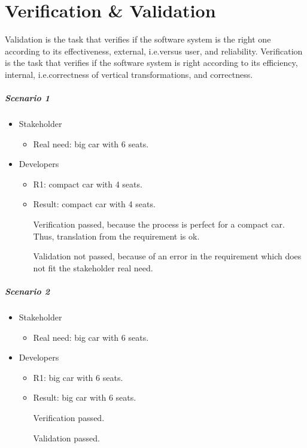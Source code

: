 \chapter{Verification \& Validation}
Validation is the task that verifies if the software system is the right one according to its effectiveness, external, i.e.\@  versus user, and reliability. Verification is the task that verifies if the software system is right according to its efficiency, internal, i.e.\@ correctness of vertical transformations, and correctness.

\paragraph{Scenario 1}
\begin{itemize}
\item Stakeholder
\begin{itemize}
\item Real need: big car with 6 seats.
\end{itemize}
\item Developers
\begin{itemize}
\item R1: compact car with 4 seats.
\item Result: compact car with 4 seats.

Verification passed, because the process is perfect for a compact car. Thus, translation from the requirement is ok.

Validation not passed, because of an error in the requirement which does not fit the stakeholder real need.
\end{itemize}
\end{itemize}

\paragraph{Scenario 2}
\begin{itemize}
\item Stakeholder
\begin{itemize}
\item Real need: big car with 6 seats.
\end{itemize}
\item Developers
\begin{itemize}
\item R1: big car with 6 seats.
\item Result: big car with 6 seats.

Verification passed.

Validation passed.
\end{itemize}
\end{itemize}


